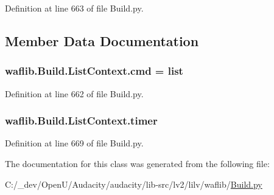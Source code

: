 Definition at line 663 of file Build.\+py.



\subsection{Member Data Documentation}
\subsubsection[{\texorpdfstring{cmd}{cmd}}]{ waflib.\+Build.\+List\+Context.\+cmd = \textquotesingle{}list\textquotesingle{}\hspace{0.3cm}{\ttfamily [static]}}\hypertarget{classwaflib_1_1_build_1_1_list_context_aeea59b217c7c13581ea3fb00ae7d0933}{}\label{classwaflib_1_1_build_1_1_list_context_aeea59b217c7c13581ea3fb00ae7d0933}


Definition at line 662 of file Build.\+py.

\subsubsection[{\texorpdfstring{timer}{timer}}]{\setlength{\rightskip}{0pt plus 5cm}waflib.\+Build.\+List\+Context.\+timer}\hypertarget{classwaflib_1_1_build_1_1_list_context_a2440b62cce031e7ed00fbbfd8245ec60}{}\label{classwaflib_1_1_build_1_1_list_context_a2440b62cce031e7ed00fbbfd8245ec60}


Definition at line 669 of file Build.\+py.



The documentation for this class was generated from the following file\+:\begin{DoxyCompactItemize}
\item 
C\+:/\+\_\+dev/\+Open\+U/\+Audacity/audacity/lib-\/src/lv2/lilv/waflib/\hyperlink{lilv_2waflib_2_build_8py}{Build.\+py}\end{DoxyCompactItemize}
